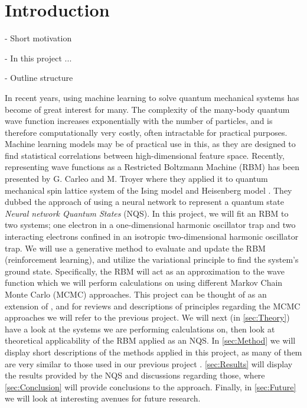 \section{Introduction}\label{sec:Introduction}

- Short motivation

- In this project ... 

- Outline structure


In recent years, using machine learning to solve quantum mechanical systems has become of great interest for many. The complexity of the many-body quantum wave function increases exponentially with the number of particles, and is therefore computationally very costly, often intractable for practical purposes. Machine learning models may be of practical use in this, as they are designed to find statistical correlations between high-dimensional feature space. Recently, representing wave functions as a Restricted Boltzmann Machine (RBM) has been presented by G. Carleo and M. Troyer where they applied it to quantum mechanical spin lattice system of the Ising model and Heisenberg model \citep{Carleo_2017}. They dubbed the approach of using a neural network to represent a quantum state \textit{Neural network Quantum States} (NQS). In this project, we will fit an RBM to two systems; one electron in a one-dimensional harmonic oscillator trap and two interacting electrons confined in an isotropic two-dimensional harmonic oscillator trap. We will use a generative method to evaluate and update the RBM (reinforcement learning), and utilize the variational principle to find the system's ground state. Specifically, the RBM will act as an approximation to the wave function which we will perform calculations on using different Markov Chain Monte Carlo (MCMC) approaches.  %
This project can be thought of as an extension of \citep{project1}, and for reviews and descriptions of principles regarding the MCMC approaches we will refer to the previous project. 
We will next (in \autoref{sec:Theory}) have a look at the systems we are performing calculations on, then look at theoretical applicability of the RBM applied as an NQS. In \autoref{sec:Method} we will display short descriptions of the methods applied in this project, as many of them are very similar to those used in our previous project \citep{project1}. \autoref{sec:Results} will display the results provided by the NQS and discussions regarding those, where \autoref{sec:Conclusion} will provide conclusions to the approach. Finally, in \autoref{sec:Future} we will look at interesting avenues for future research. 


